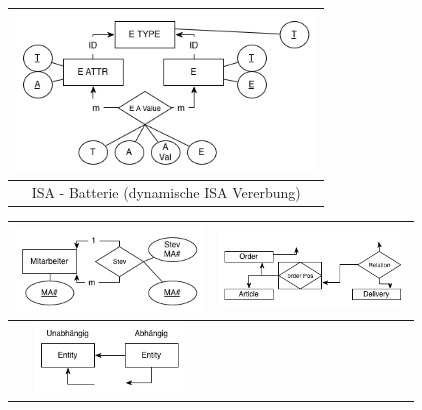 \begin{tabular}{|c|}
\hline 
\includegraphics[width=8cm]{Design/f8}\tabularnewline
\hline 
ISA - Batterie (dynamische ISA Vererbung)\tabularnewline
\hline 
\end{tabular}%
\begin{tabular}{|c|c|}
\hline 
\includegraphics[width=5cm]{Design/f9} & \includegraphics[width=5cm]{Design/f11}\tabularnewline
\hline 
\includegraphics[width=4cm]{Design/f10} & \tabularnewline
\hline 
\end{tabular}
